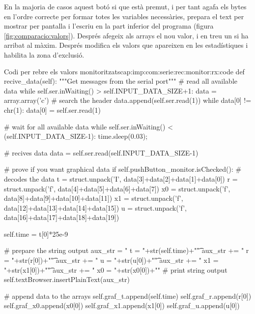 En la majoria de casos aquest botó si que està premut, i per tant agafa els bytes en l'ordre correcte per formar totes les variables necessàries, prepara el text per mostrar per pantalla i l'escriu en la part inferior del programa (figura \ref{fig:comparacio:valors}). Després afegeix als arrays el nou valor, i en treu un si ha arribat al màxim.
Després modifica els valors que apareixen en les estadístiques i habilita la zona d'exclusió.

\begin{code_python}{Codi per rebre els valors monitoritzats}{cap:imp:com:serie:rec:monitor:rx:code}
def recive_data(self):
    """Get messages from the serial port"""
    # read all available data
    while self.ser.inWaiting() > self.INPUT_DATA_SIZE+1:
        data = array.array('c')
        # search the header
        data.append(self.ser.read(1))
        while data[0] != chr(1):
            data[0] = self.ser.read(1)
            
        # wait for all available data
        while self.ser.inWaiting() < (self.INPUT_DATA_SIZE-1):
            time.sleep(0.03);
            
        # recives data
        data = self.ser.read(self.INPUT_DATA_SIZE-1)
        
        # prove if you want graphical data
        if self.pushButton_monitor.isChecked():
            # decodes the data
            t  = struct.unpack('I', data[3]+data[2]+data[1]+data[0])
            r  = struct.unpack('f', data[4]+data[5]+data[6]+data[7])
            x0 = struct.unpack('f', data[8]+data[9]+data[10]+data[11])
            x1 = struct.unpack('f', data[12]+data[13]+data[14]+data[15])
            u  = struct.unpack('f', data[16]+data[17]+data[18]+data[19])
            
            self.time = t[0]*25e-9
            
            # prepare the string output
            aux_str  = " t = "+str(self.time)+"\t"
            aux_str += " r = "+str(r[0])+"\t"
            aux_str += " u = "+str(u[0])+"\t"
            aux_str += " x1 = "+str(x1[0])+"\t"
            aux_str += " x0 = "+str(x0[0])+"\n"
            # print string output
            self.textBrowser.insertPlainText(aux_str)
            
            # append data to the arrays
            self.graf_t.append(self.time)
            self.graf_r.append(r[0])
            self.graf_x0.append(x0[0])
            self.graf_x1.append(x1[0])
            self.graf_u.append(u[0])
            

\end{code_python}
